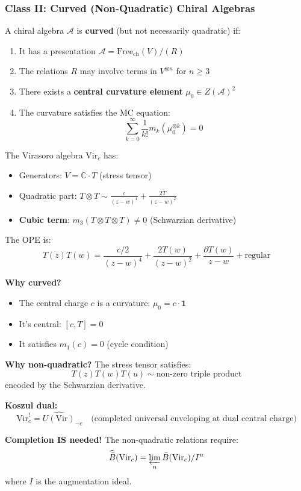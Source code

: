 \subsubsection{Class II: Curved (Non-Quadratic) Chiral Algebras}

\begin{definition}\label{def:curved-chiral-detailed}
A chiral algebra $\mathcal{A}$ is \textbf{curved} (but not necessarily quadratic) if:
\begin{enumerate}
\item It has a presentation $\mathcal{A} = \text{Free}_{\text{ch}}(V) / (R)$
\item The relations $R$ may involve terms in $V^{\otimes n}$ for $n \geq 3$
\item There exists a \textbf{central curvature element} $\mu_0 \in Z(\mathcal{A})^2$
\item The curvature satisfies the MC equation: 
$$\sum_{k=0}^\infty \frac{1}{k!} m_k(\mu_0^{\otimes k}) = 0$$
\end{enumerate}
\end{definition}

\begin{example}\label{ex:virasoro-curved}
The Virasoro algebra $\text{Vir}_c$ has:
\begin{itemize}
\item Generators: $V = \mathbb{C} \cdot T$ (stress tensor)
\item Quadratic part: $T \otimes T \sim \frac{c}{(z-w)^4} + \frac{2T}{(z-w)^2}$
\item \textbf{Cubic term}: $m_3(T \otimes T \otimes T) \neq 0$ (Schwarzian derivative)
\end{itemize}

The OPE is:
$$T(z)T(w) = \frac{c/2}{(z-w)^4} + \frac{2T(w)}{(z-w)^2} + \frac{\partial T(w)}{z-w} + \text{regular}$$

\textbf{Why curved?}
\begin{itemize}
\item The central charge $c$ is a curvature: $\mu_0 = c \cdot \mathbf{1}$
\item It's central: $[c, T] = 0$
\item It satisfies $m_1(c) = 0$ (cycle condition)
\end{itemize}

\textbf{Why non-quadratic?}
The stress tensor satisfies:
$$T(z)T(w)T(u) \sim \text{non-zero triple product}$$
encoded by the Schwarzian derivative.

\textbf{Koszul dual:}
$$\text{Vir}_c^! = \widehat{U(\text{Vir})}_{-c} 
\quad \text{(completed universal enveloping at dual central charge)}$$

\textbf{Completion IS needed!} The non-quadratic relations require:
$$\widehat{\bar{B}}(\text{Vir}_c) = \varprojlim_n \bar{B}(\text{Vir}_c)/I^n$$
where $I$ is the augmentation ideal.
\end{example}

